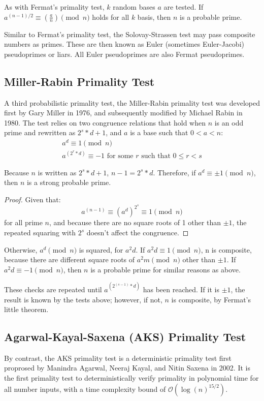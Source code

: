 \documentclass{article}
\begin{document}
As with Fermat's primality test, $k$ random bases $a$ are tested. If $a^{(n - 1) / 2} \equiv (\frac{a}{n}) \pmod{n}$ holds for all $k$ basis, then $n$ is a probable prime.

Similar to Fermat's primality test, the Solovay-Strassen test may pass composite numbers as primes. These are then known as Euler (sometimes Euler-Jacobi) pseudoprimes or liars. All Euler pseudoprimes are also Fermat pseudoprimes. 

\subsection{Miller-Rabin Primality Test} %
A third probabilistic primality test, the Miller-Rabin primality test was developed first by Gary Miller in 1976, and subsequently modified by Michael Rabin in 1980. The test relies on two congruence relations that hold when $n$ is an odd prime and rewritten as $2^s * d + 1$, and $a$ is a base such that $0 < a < n$:
\begin{gather*}
    a^d \equiv 1 \pmod{n} \\
    a^{(2^r * d)} \equiv -1 \text{ for some $r$ such that $0 \leq r < s$}
\end{gather*}

Because $n$ is written as $2^s * d + 1$, $n - 1 = 2^s * d$. Therefore, if $a^d \equiv \pm 1 \pmod{n}$, then $n$ is a strong probable prime.

\begin{proof}
    Given that:
    \[
        a^{(n - 1)} \equiv (a^d)^{2^s} \equiv 1 \pmod{n}
    \]
    for all prime $n$, and because there are no square roots of 1 other than $\pm 1$, the repeated squaring with $2^s$ doesn't affect the congruence.
\end{proof}

Otherwise, $a^d \pmod{n}$ is squared, for $a^2d$. If $a^2d \equiv 1 \pmod{n}$, n is composite, because there are different square roots of $a^2m \pmod{n}$ other than $\pm 1$. If $a^2d \equiv -1 \pmod{n}$, then $n$ is a probable prime for similar reasons as above.

These checks are repeated until $a^{(2^{(s - 1)} * d)}$ has been reached. If it is $\pm 1$, the result is known by the tests above; however, if not, $n$ is composite, by Fermat's little theorem.

\subsection{Agarwal-Kayal-Saxena (AKS) Primality Test} %
\label{theory:aks}
By contrast, the AKS primality test is a deterministic primality test first proprosed by Manindra Agarwal, Neeraj Kayal, and Nitin Saxena in 2002. It is the first primality test to deterministically verify primality in polynomial time for all number inputs, with a time complexity bound of $\mathcal{O}(\log{(n)}^{15/2})$.
\end{document}
